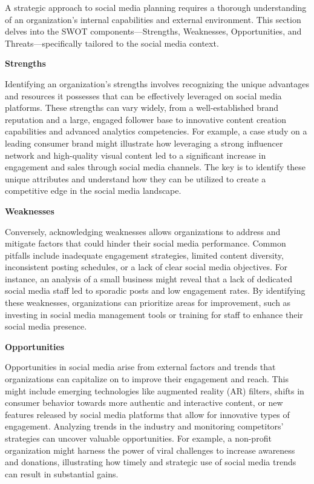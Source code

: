 \documentclass[
]{book}
\begin{document}
A strategic approach to social media planning requires a thorough understanding of an organization's internal capabilities and external environment. This section delves into the SWOT components---Strengths, Weaknesses, Opportunities, and Threats---specifically tailored to the social media context.

\textbf{Strengths}

Identifying an organization's strengths involves recognizing the unique advantages and resources it possesses that can be effectively leveraged on social media platforms. These strengths can vary widely, from a well-established brand reputation and a large, engaged follower base to innovative content creation capabilities and advanced analytics competencies. For example, a case study on a leading consumer brand might illustrate how leveraging a strong influencer network and high-quality visual content led to a significant increase in engagement and sales through social media channels. The key is to identify these unique attributes and understand how they can be utilized to create a competitive edge in the social media landscape.

\textbf{Weaknesses}

Conversely, acknowledging weaknesses allows organizations to address and mitigate factors that could hinder their social media performance. Common pitfalls include inadequate engagement strategies, limited content diversity, inconsistent posting schedules, or a lack of clear social media objectives. For instance, an analysis of a small business might reveal that a lack of dedicated social media staff led to sporadic posts and low engagement rates. By identifying these weaknesses, organizations can prioritize areas for improvement, such as investing in social media management tools or training for staff to enhance their social media presence.

\textbf{Opportunities}

Opportunities in social media arise from external factors and trends that organizations can capitalize on to improve their engagement and reach. This might include emerging technologies like augmented reality (AR) filters, shifts in consumer behavior towards more authentic and interactive content, or new features released by social media platforms that allow for innovative types of engagement. Analyzing trends in the industry and monitoring competitors' strategies can uncover valuable opportunities. For example, a non-profit organization might harness the power of viral challenges to increase awareness and donations, illustrating how timely and strategic use of social media trends can result in substantial gains.
\end{document}
